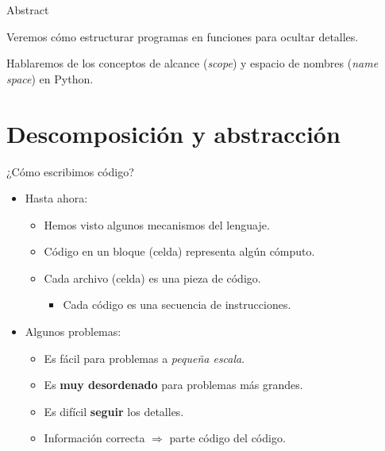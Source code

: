 \documentclass[mathserif]{beamer}
\subtitle{%
  \bfseries{Funciones: descomposición y abstracción}\\%
}
\begin{document}


\begin{frame}{Abstract}
    
	\begin{blurb}
		Veremos cómo estructurar programas en funciones para ocultar detalles.
		
		Hablaremos de los conceptos de alcance (\textit{scope}) y espacio de nombres (\textit{name space}) en Python.
		
	\end{blurb}
\end{frame}

\section{Descomposición y abstracción}

\begin{frame}[fragile]{¿Cómo escribimos código?}
    \begin{itemize}
        \item Hasta ahora: 
        \begin{itemize}
            \item Hemos visto algunos mecanismos del lenguaje.
            \item Código en un bloque (celda) representa algún cómputo.
            \item Cada archivo (celda) es una pieza de código.
            \begin{itemize}
                \item Cada código es una secuencia de instrucciones.
            \end{itemize}
        \end{itemize}
        
        \item Algunos {\blue problemas}:
        \begin{itemize}
            \item Es fácil para problemas a \textit{pequeña escala}.
            \item Es {\blue\bfseries muy desordenado} para problemas más grandes.
            
            \item Es difícil {\blue\bfseries seguir} los detalles.
            \item Información correcta $\Rightarrow$ parte código del código.
        \end{itemize}
    \end{itemize}
\end{frame}
\end{document}
